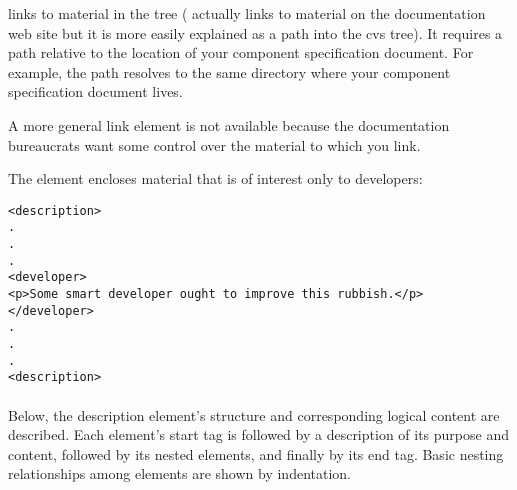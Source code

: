 \documentclass[11pt]{article}
\begin{document}
 links to material in the  tree
( actually links to material on the documentation web site
but it is more easily explained as a path into the cvs tree).  It requires
a path relative to the location of your component specification document.  For
example, the path  resolves to the same directory
where your component specification document lives.

A more general link element is not available because the documentation
bureaucrats want some control over the material to which you link.

The  element encloses material that is of interest only to
developers:

\begin{verbatim}
<description>
.
.
.
<developer>
<p>Some smart developer ought to improve this rubbish.</p>
</developer>
.
.
.
<description>
\end{verbatim}

\paragraph{\SUBSUBSECreference}
\label{\SUBSUBSECreference}

Below, the description element's \xml{} structure and corresponding logical
content are described.  Each element's start tag is followed by a
description of its purpose and content, followed by its nested elements,
and finally by its end tag.  Basic nesting relationships among elements are
shown by indentation.

\end{document}
